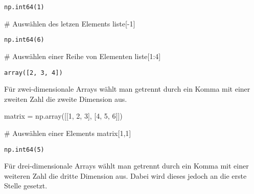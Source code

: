 \documentclass[
  letterpaper,
  DIV=11,
  numbers=noendperiod]{scrreprt}
\newenvironment{Shaded}{\begin{snugshade}}{\end{snugshade}}
\newcommand{\CommentTok}[1]{\textcolor[rgb]{0.37,0.37,0.37}{#1}}
\newcommand{\DecValTok}[1]{\textcolor[rgb]{0.68,0.00,0.00}{#1}}
\newcommand{\NormalTok}[1]{\textcolor[rgb]{0.00,0.23,0.31}{#1}}
\newcommand{\OperatorTok}[1]{\textcolor[rgb]{0.37,0.37,0.37}{#1}}
\begin{document}
\begin{tcolorbox}
\begin{verbatim}
np.int64(1)
\end{verbatim}

\begin{Shaded}
\begin{Highlighting}[]
\CommentTok{\# Auswählen des letzen Elements}
\NormalTok{liste[}\OperatorTok{{-}}\DecValTok{1}\NormalTok{]}
\end{Highlighting}
\end{Shaded}

\begin{verbatim}
np.int64(6)
\end{verbatim}

\begin{Shaded}
\begin{Highlighting}[]
\CommentTok{\# Auswählen einer Reihe von Elementen}
\NormalTok{liste[}\DecValTok{1}\NormalTok{:}\DecValTok{4}\NormalTok{]}
\end{Highlighting}
\end{Shaded}

\begin{verbatim}
array([2, 3, 4])
\end{verbatim}

Für zwei-dimensionale Arrays wählt man getrennt durch ein Komma mit
einer zweiten Zahl die zweite Dimension aus.

\begin{Shaded}
\begin{Highlighting}[]
\NormalTok{matrix }\OperatorTok{=}\NormalTok{ np.array([[}\DecValTok{1}\NormalTok{, }\DecValTok{2}\NormalTok{, }\DecValTok{3}\NormalTok{], [}\DecValTok{4}\NormalTok{, }\DecValTok{5}\NormalTok{, }\DecValTok{6}\NormalTok{]])}
\end{Highlighting}
\end{Shaded}

\begin{Shaded}
\begin{Highlighting}[]
\CommentTok{\# Auswählen einer Elements}
\NormalTok{matrix[}\DecValTok{1}\NormalTok{,}\DecValTok{1}\NormalTok{]}
\end{Highlighting}
\end{Shaded}

\begin{verbatim}
np.int64(5)
\end{verbatim}

Für drei-dimensionale Arrays wählt man getrennt durch ein Komma mit
einer weiteren Zahl die dritte Dimension aus. Dabei wird dieses jedoch
an die erste Stelle gesetzt.


\end{tcolorbox}
\end{document}
